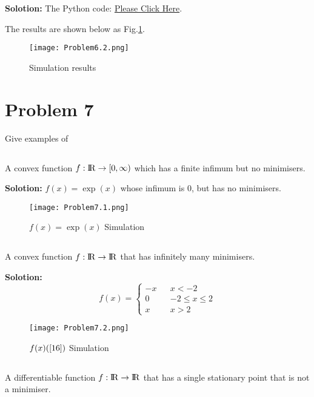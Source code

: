 \documentclass[a4paper,11pt,reqno]{amsart}
\newcommand{\R}{{\rm I\!R}}
\begin{document}
\textbf{Solotion:}
The Python code: \href{https://github.com/Chanawesome/ELE8088-EXTRA/blob/main/Problem6.2.py}{Please Click Here}.

The results are shown below as Fig.\ref{f6}.
\begin{figure}[H]
    \centering
    \texttt{[image: Problem6.2.png]}
    \caption{Simulation results}
    \label{f6}
    \end{figure}

\section{Problem 7}

Give examples of
\subsection{}
A convex function $f:\R\rightarrow[0,\infty)$ which has a finite infimum but no minimisers.

\textbf{Solotion:}
$f(x) = \exp(x)$ whose infimum is 0, but has no minimisers.
\begin{figure}[H]
    \centering
    \texttt{[image: Problem7.1.png]}
    \caption{$f(x) = \exp(x)$ Simulation}
    \label{f7.1}
    \end{figure}

\subsection{}
A convex function $f:\R\rightarrow\R$ that has infinitely many minimisers.

\textbf{Solotion:}
\begin{equation}
 f(x)=\left\{
\begin{array}{rcl}
-x & & {x < -2}\\
0 & & {-2 \leq x \leq 2}\\
x & & {x > 2}
\end{array} \right. 
\label{16}
\end{equation}

\begin{figure}[H]
    \centering
    \texttt{[image: Problem7.2.png]}
    \caption{$f(x)(\ref{16})$ Simulation}
    \label{f7.2}
    \end{figure}

\subsection{}
A differentiable function $f:\R\rightarrow\R$ that has a single stationary point that is not a minimiser.
\end{document}
